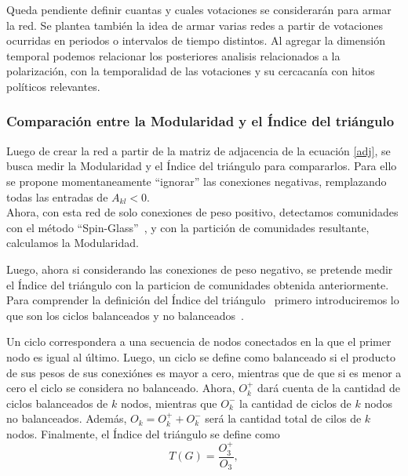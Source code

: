 \documentclass{proyectotesis}
\begin{document}
Queda pendiente definir cuantas y cuales votaciones se considerarán para armar la red. Se plantea también la idea de armar varias redes a partir de votaciones ocurridas en periodos o intervalos de tiempo distintos. Al agregar la dimensión temporal podemos relacionar los posteriores analisis relacionados a la polarización, con la temporalidad de las votaciones y su cercacanía con hitos políticos relevantes.

\subsubsection{Comparación entre la Modularidad y el Índice del triángulo} 
Luego de crear la red a partir de la matriz de adjacencia de la ecuación \eqref{adj}, se busca medir la Modularidad y el Índice del triángulo para compararlos. Para ello se propone momentaneamente ``ignorar'' las conexiones negativas, remplazando todas las entradas de $A_{kl} < 0$.\\ 

Ahora, con esta red de solo conexiones de peso positivo, detectamos comunidades con el método ``Spin-Glass''~\cite{Reichardt_2006}, y con la partición de comunidades resultante, calculamos la Modularidad. 

Luego, ahora si considerando las conexiones de peso negativo, se pretende medir el Índice del triángulo con la particion de comunidades obtenida anteriormente.\\

Para comprender la definición del Índice del triángulo~\cite{Aref_2018} primero introduciremos lo que son los ciclos balanceados y no balanceados~\cite{Aref_2018}.

Un ciclo correspondera a una secuencia de nodos conectados en la que el primer nodo es igual al último. Luego, un ciclo se define como balanceado si el producto de sus pesos de sus conexiónes es mayor a cero, mientras que de que si es menor a cero el ciclo se considera no balanceado. 
Ahora, $O_k^+$ dará cuenta de la cantidad de ciclos balanceados de $k$ nodos, mientras que $O_k^-$ la cantidad de ciclos de $k$ nodos no balanceados. Además, $O_k = O_k^+ + O_k^-$ será la cantidad total de cilos de $k$ nodos. Finalmente, el Índice del triángulo se define como
\begin{equation}
    T(G) = \frac{O_3^+}{O_3},
\end{equation}
\end{document}
